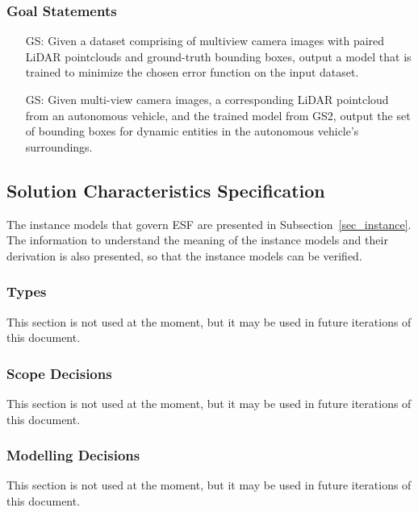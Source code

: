 \documentclass[12pt]{article}
\newcounter{goalnum} %
\newcommand{\ProjectName}{ESF }
\begin{document}
\subsubsection{Goal Statements}
\begin{itemize}

\item[GS\refstepcounter{goalnum}\thegoalnum \label{goal:training}:] Given a dataset comprising of multiview 
camera images with paired LiDAR pointclouds and ground-truth bounding boxes, output a model that is trained
to minimize the chosen error function on the input dataset.

\item[GS\refstepcounter{goalnum}\thegoalnum \label{goal:inference}:] Given multi-view camera images, a 
corresponding LiDAR pointcloud from an autonomous vehicle, and the trained model from GS2, output the set of bounding boxes for dynamic entities
in the autonomous vehicle's surroundings.

\end{itemize}

\subsection{Solution Characteristics Specification}

The instance models that govern \ProjectName are presented in
Subsection~\ref{sec_instance}.  The information to understand the meaning of the
instance models and their derivation is also presented, so that the instance
models can be verified.

\subsubsection{Types}

This section is not used at the moment, but it may be used in future iterations of this document.

\subsubsection{Scope Decisions}

This section is not used at the moment, but it may be used in future iterations of this document.
\subsubsection{Modelling Decisions}

This section is not used at the moment, but it may be used in future iterations of this document.
\end{document}
